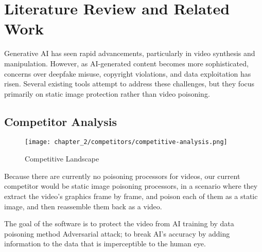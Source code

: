 \chapter{Literature Review and Related Work}
\label{chap:relatedworks}

Generative AI has seen rapid advancements, particularly in video synthesis and manipulation. 
However, as AI-generated content becomes more sophisticated, concerns over deepfake misuse, copyright violations, 
and data exploitation has risen. Several existing tools attempt to address these challenges, 
but they focus primarily on static image protection rather than video poisoning.

\clearpage

\section{Competitor Analysis}
\label{section:competitor-analysis}

\begin{figure}[h]
    \centering
    \texttt{[image: chapter\_2/competitors/competitive-analysis.png]}
    \caption{Competitive Landscape}

\end{figure}

Because there are currently no poisoning processors for videos, our current competitor would be static image poisoning processors, in a scenario where they extract the video's graphics frame by frame, and poison each of them as a static image, and then reassemble them back as a video.

    The goal of the software is to protect the video from AI training by data poisoning method Adversarial attack; to break AI's accuracy by adding information to the data that is imperceptible to the human eye.

    \clearpage

